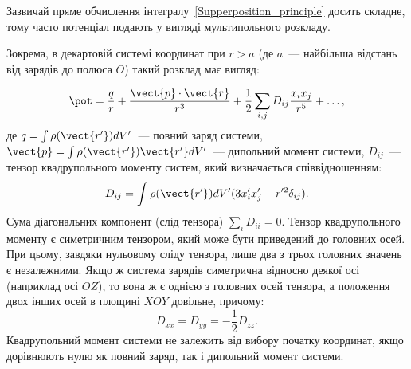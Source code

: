 \begin{Theory}
	\begin{center}
	\end{center}

	Зазвичай пряме обчислення інтегралу~\eqref{Supperposition_principle} досить складне, тому часто потенціал подають у вигляді мультипольного розкладу.

	Зокрема, в декартовій системі координат при $r > a$ (де $a$~--- найбільша відстань від зарядів до полюса $O$) такий розклад має вигляд:

	\begin{equation}\label{eq:multipole2}
		\pot = \frac{q}{r} + \frac{\vect{p}\cdot\vect{r}}{r^3} + \frac12\sum\limits_{i,j} D_{ij}\frac{x_ix_j}{r^5} + \ldots,
	\end{equation}
	де $q = \int \rho(\vect{r'}) dV'$~--- повний заряд системи, $\vect{p} =\int \rho(\vect{r'}) \vect{r'} dV'$~--- дипольний момент системи, $D_{ij}$~--- тензор квадрупольного моменту систем, який визначається співвідношенням:
	\begin{equation}\label{eq:Quadrupole_momentum}
		D_{ij} = \int \rho(\vect{r'}) dV' (3x'_ix'_j - r^{\prime 2}\delta_{ij}).
	\end{equation}
	Сума діагональних компонент (слід тензора) $\sum\limits_{i} D_{ii} = 0$. Тензор квадрупольного моменту є симетричним тензором, який може бути приведений до головних осей. При цьому, завдяки нульовому сліду тензора, лише два з трьох головних значень є незалежними. Якщо ж система зарядів симетрична відносно деякої осі (наприклад осі $OZ$), то вона ж є однією з головних осей тензора, а положення двох інших осей в площині $XOY$ довільне, причому:
	\begin{equation}\label{eq:Quadrupole_momentum_values}
		D_{xx} = D_{yy} = -\frac12 D_{zz}.
	\end{equation}
	Квадрупольний момент системи не залежить від вибору початку координат, якщо дорівнюють нулю як повний заряд, так і дипольний момент системи.


\end{Theory}

